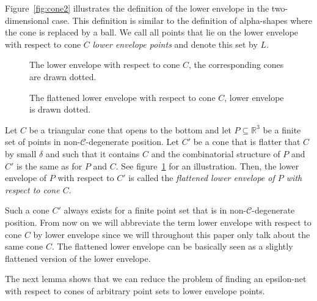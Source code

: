 \documentclass{stacs_proc}
\newcommand{\setR}{\mathbb{R}}
\newcommand{\C}{\mathcal{C}}
\begin{document}
Figure~\ref{fig:cone2} illustrates the definition of the lower envelope
in the two-dimensional case.
This definition is similar to the definition of alpha-shapes where
the cone is replaced by a ball.
We call all points that lie on the lower envelope with respect to cone
$C$ \emph{lower envelope points} and denote this set by $L$. 
\begin{figure}[h]
\begin{minipage}{0.49\textwidth}
  \begin{center}
    \vspace{-3ex}
    \caption{The lower envelope with respect to cone $C$, the
      corresponding cones are drawn dotted.} 
    \label{fig:cone2}
  \end{center}
\end{minipage}\hfill
\begin{minipage}{0.49\textwidth}
  \begin{center}
     \vspace{-3ex}
    \caption{The flattened lower envelope with respect to cone $C$,
      lower envelope is drawn dotted.} 
    \label{fig:cone3}
  \end{center}
\end{minipage}
\end{figure}

\begin{defi}
  Let $C$ be a triangular cone that opens to the bottom and let $P\subseteq
  \setR^3$ be a finite set of points in non-$\C$-degenerate position. Let
  $C'$ be a cone that is flatter that $C$ by small $\delta$ and such that
  it contains $C$ and the combinatorial structure of $P$ and $C'$ is
  the same as for $P$ and $C$. See figure~\ref{fig:cone3} for an
  illustration. Then, the lower envelope of $P$ with respect to $C'$
  is called the \emph{flattened lower envelope of $P$ with respect to cone $C$}.
\end{defi}
Such a cone $C'$ always exists for a finite point set that is in
non-$\C$-degenerate position.
From now on we will abbreviate the term lower envelope with respect to
cone $C$ by lower envelope since we will throughout this paper only
talk about the same cone $C$. The flattened lower envelope can  be
basically seen as a slightly flattened version of the lower envelope.



The next lemma shows that we can reduce the problem of finding an
epsilon-net with respect to cones of arbitrary point sets to lower
envelope points.
\end{document}
